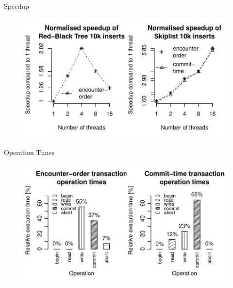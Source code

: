 \begin{frame}{Speedup}
\begin{figure}
    \centering
    \includegraphics[width=\textwidth]{images/plots10k-speedup.pdf}
\end{figure}
\end{frame}

\begin{frame}{Operation Times}
\begin{figure}
    \centering
    \includegraphics[width=\textwidth]{images/op-times.pdf}
\end{figure}
\end{frame}
